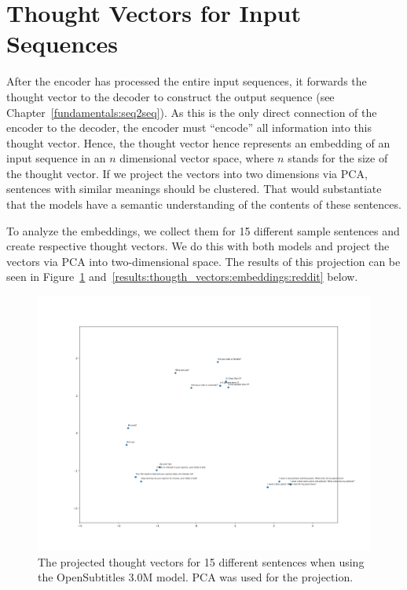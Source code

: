 \section{Thought Vectors for Input Sequences}\label{results:thought_vector_clustering} After the encoder has processed the entire input sequences, it forwards the thought vector to the decoder to construct the output sequence (see Chapter~\ref{fundamentals:seq2seq}). As this is the only direct connection of the encoder to the decoder, the encoder must ``encode'' all information into this thought vector. Hence, the thought vector hence represents an embedding of an input sequence in an $n$ dimensional vector space, where $n$ stands for the size of the thought vector. If we project the vectors into two dimensions via PCA, sentences with similar meanings should be clustered. That would substantiate that the models have a semantic understanding of the contents of these sentences.

To analyze the embeddings, we collect them for 15 different sample sentences and create respective thought vectors. We do this with both models and project the vectors via PCA into two-dimensional space. The results of this projection can be seen in Figure~\ref{results:thougth_vectors:embeddings:opensubtitles} and~\ref{results:thougth_vectors:embeddings:reddit} below.

\begin{figure}[!htb]
	\centering
	\includegraphics[width=14cm]{img/opensubtitles_thought_vector_embeddings.png}
	\caption{The projected thought vectors for 15 different sentences when using the OpenSubtitles 3.0M model. PCA was used for the projection.}
	\label{results:thougth_vectors:embeddings:opensubtitles}
\end{figure}

